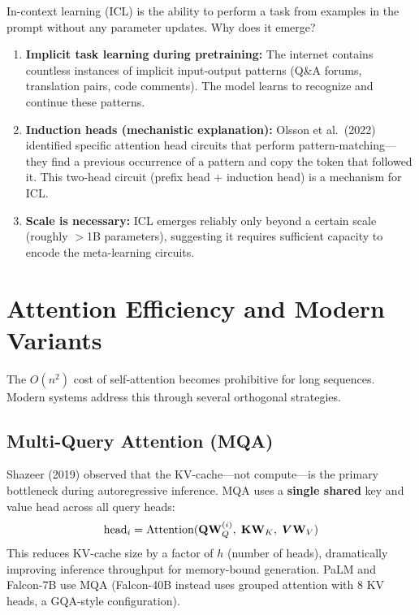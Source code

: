 In-context learning (ICL) is the ability to perform a task from examples in
the prompt without any parameter updates.  Why does it emerge?

\begin{enumerate}
    \item \textbf{Implicit task learning during pretraining:} The internet
          contains countless instances of implicit input-output patterns
          (Q\&A forums, translation pairs, code comments).  The model learns
          to recognize and continue these patterns.
    \item \textbf{Induction heads (mechanistic explanation):} Olsson et al.\
          (2022) identified specific attention head circuits that perform
          pattern-matching---they find a previous occurrence of a pattern and
          copy the token that followed it.  This two-head circuit (prefix head
          + induction head) is a mechanism for ICL.
    \item \textbf{Scale is necessary:} ICL emerges reliably only beyond a
          certain scale (roughly $>$1B parameters), suggesting it requires
          sufficient capacity to encode the meta-learning circuits.
\end{enumerate}


\section{Attention Efficiency and Modern Variants}
\label{sec:attention-efficiency}

The $O(n^2)$ cost of self-attention becomes prohibitive for long sequences.
Modern systems address this through several orthogonal strategies.

\subsection{Multi-Query Attention (MQA)}

Shazeer (2019) observed that the KV-cache---not compute---is the primary
bottleneck during autoregressive inference.  MQA uses a \textbf{single shared}
key and value head across all query heads:
\[
    \text{head}_i = \text{Attention}(\mathbf{Q} \mathbf{W}_Q^{(i)},\; \mathbf{K} \mathbf{W}_K,\; \bm{V} \mathbf{W}_V)
\]
This reduces KV-cache size by a factor of $h$ (number of heads), dramatically
improving inference throughput for memory-bound generation.  PaLM and
Falcon-7B use MQA (Falcon-40B instead uses grouped attention with 8 KV
heads, a GQA-style configuration).

